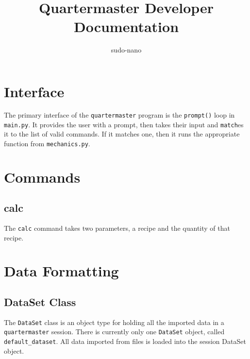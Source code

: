 \documentclass{article}
\title{Quartermaster Developer Documentation}
\author{sudo-nano}
\begin{document}
\maketitle

\tableofcontents

\section{Interface}
The primary interface of the \verb|quartermaster| program is the \verb|prompt()| loop in \verb|main.py|. It provides the user with a prompt, then takes their input and \verb|match|es it to the list of valid commands. If it matches one, then it runs the appropriate function from \verb|mechanics.py|. 


\section{Commands}

\subsection{calc}
The \verb|calc| command takes two parameters, a recipe and the quantity of that recipe. 

\section{Data Formatting}

\subsection{DataSet Class}
The \verb|DataSet| class is an object type for holding all the imported data in a \verb|quartermaster| session. There is currently only one \verb|DataSet| object, called \verb|default_dataset|. 
All data imported from files is loaded into the session DataSet object. 
\end{document}
